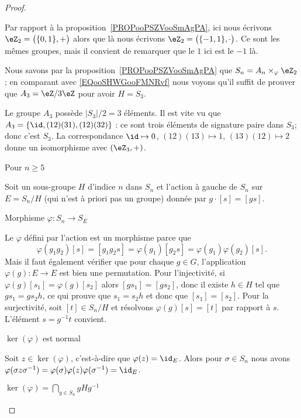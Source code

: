 \begin{proof}
\begin{subproof}
		Par rapport à la proposition~\ref{PROPooPSZVooSmAgPA}, ici nous écrivons \( \eZ_2=\big( \{ 0,1 \},+ \big)\) alors que là nous écrivons \( \eZ_2=\big( \{ -1,1 \},\cdot \big)\). Ce sont les mêmes groupes, mais il convient de remarquer que le \( 1\) ici est le \( -1\) là.

		Nous savons par la proposition~\ref{PROPooPSZVooSmAgPA} que \( S_n=A_n\times_{\varphi}\eZ_2\); en comparant avec \eqref{EQooSHWGooFMNRvf} nous voyons qu'il suffit de prouver que \( A_3=\eZ/3\eZ\) pour avoir \( H=S_3\).

		Le groupe \( A_3\) possède \( | S_3 |/2=3\) éléments. Il est vite vu que \( A_3=\{ \id,(12)(31), (12)(32) \}\) : ce sont trois éléments de signature paire dans \( S_3\); donc c'est \( S_3\). La correspondance \( \id\mapsto 0\), \( (12)(13)\mapsto 1\), \( (13)(12)\mapsto 2\) donne un isomorphisme avec \( (\eZ_3,+)\).

		\item[Pour \( n\geq 5\)]

		Soit un sous-groupe \( H\) d'indice \( n\) dans \( S_n\) et l'action à gauche de \( S_n\) sur \( E=S_n/H\) (qui n'est à priori pas un groupe) donnée par \( g\cdot [s]=[gs]\).

		\begin{subproof}
			\item[Morphisme \( \varphi\colon S_n\to S_E\)]

			Le \( \varphi\) défini par l'action est un morphisme parce que
			\begin{equation}
				\varphi(g_1g_2)[s]=[g_1g_2s]=\varphi(g_1)[g_2s]=\varphi(g_1)\varphi(g_2)[s].
			\end{equation}
			Mais il faut également vérifier que pour chaque \( g\in G\), l'application \( \varphi(g)\colon E\to E\) est bien une permutation. Pour l'injectivité, si \( \varphi(g)[s_1]=\varphi(g)[s_2]\) alors \( [gs_1]=[gs_2]\), donc il existe \( h\in H\) tel que \( gs_1=gs_2h\), ce qui prouve que \( s_1=s_2h\) et donc que \( [s_1]=[s_2]\). Pour la surjectivité, soit \( [t]\in S_n/H\) et résolvons \( \varphi(g)[s]=[t]\) par rapport à \( s\). L'élément \( s=g^{-1} t\) convient.

			\item[\( \ker(\varphi)\) est normal]

			Soit \( z\in\ker(\varphi)\), c'est-à-dire que \( \varphi(z)=\id_E\). Alors pour \( \sigma\in S_n\) nous avons \( \varphi(\sigma z\sigma^{-1})=\varphi(\sigma)\varphi(z)\varphi(\sigma^{-1})=\id_E\).

			\item[\( \ker(\varphi)=\bigcap_{g\in S_n}gHg^{-1}\)]


\end{subproof}
\end{subproof}
\end{proof}
